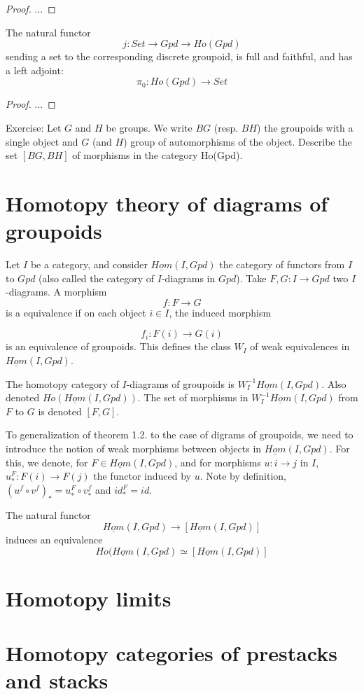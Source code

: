 \documentclass[../main.tex]{subfiles}
\begin{document}
\begin{proof}
...
\end{proof}

\begin{cor}
    The natural functor
    \[
        j: Set \to Gpd \to Ho(Gpd)
    \]
    sending a set to the corresponding discrete groupoid, is full and faithful, and has a left adjoint:
    \[
        \pi_0: Ho(Gpd) \to Set
    \]
\end{cor}

\begin{proof}
...
\end{proof}

Exercise: Let $G$ and $H$ be groups. We write $BG$ (resp. $BH$) the groupoids with a single object and $G$ (and $H$) group of automorphisms of the object. Describe the set $[BG, BH]$ of morphisms in the category Ho(Gpd).

\section{Homotopy theory of diagrams of groupoids}

Let $I$ be a category, and consider $\underline{Hom}(I, Gpd)$ the category of functors from $I$ to $Gpd$ (also called the category of $I$-diagrams in $Gpd$). Take $F, G: I \to Gpd$ two $I$-diagrams. A morphism
\[
    f: F \to G
\]
is a equivalence if on each object $i\in I$, the induced morphism

\[
f_i: F(i) \to G(i)
\]
is an equivalence of groupoids. This defines the class $W_I$ of weak equivalences in $\underline{Hom}(I, Gpd)$.
\begin{defn}
    The homotopy category of $I$-diagrams of groupoids is $W_I^{-1}\underline{Hom}(I, Gpd)$. Also denoted $Ho(\underline{Hom}(I, Gpd))$. The set of morphisms in $W_I^{-1}\underline{Hom}(I, Gpd)$ from $F$ to $G$ is denoted $[F, G]$.
\end{defn}

To generalization of theorem 1.2. to the case of digrams of groupoids, we need to introduce the notion of weak morphisms between objects in $\underline{Hom}(I, Gpd)$. For this, we denote, for $F \in \underline{Hom}(I, Gpd)$, and for morphisms $u: i \to j$ in $I$, $u_*^F: F(i) \to F(j)$ the functor induced by $u$. Note by definition, $(u^f \circ v^f)_* = u_*^F \circ v_*^f$ and $id_*^F = id$.

\begin{thm}
    The natural functor
    \[
        \underline{Hom}(I, Gpd) \to [\underline{Hom}(I, Gpd)]
    \]
    induces an equivalence
    \[
        Ho(\underline{Hom}(I, Gpd) \simeq [\underline{Hom}(I, Gpd)]
    \]

\end{thm}



\section{Homotopy limits}
\section{Homotopy categories of prestacks and stacks}
\end{document}
